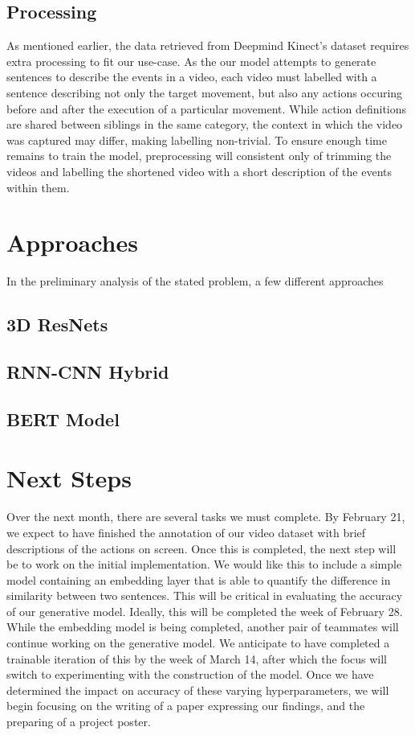 \documentclass[10pt]{article}
\begin{document}
\subsection{Processing}
As mentioned earlier, the data retrieved from Deepmind Kinect's dataset requires extra processing to fit our use-case.
As the our model attempts to generate sentences to describe
the events in a video, each video must labelled with a sentence describing not only the target movement, but also
any actions occuring before and after the execution of a particular movement. While action definitions are shared between siblings
in the same category, the context in which the video was captured may differ, making labelling non-trivial.
To ensure enough time remains to train the model, preprocessing will consistent only of 
trimming the videos and labelling the shortened video with a short description of the events within them.

\section{Approaches}

In the preliminary analysis of the stated problem, a few different approaches 

\subsection{3D ResNets}

\subsection{RNN-CNN Hybrid}

\subsection{BERT Model}


\section{Next Steps}
Over the next month, there are several tasks we must complete. By February 21, we expect to have finished the annotation of our video
dataset with brief descriptions of the actions on screen. Once this is completed, the next step will be to work on the initial implementation.
We would like this to include a simple model containing an embedding layer that is able to quantify the difference in similarity between
two sentences. This will be critical in evaluating the accuracy of our generative model. Ideally, this will be completed the week of February 28.
While the embedding model is being completed, another pair of teammates will continue working on the generative model. We anticipate to have completed
a trainable iteration of this by the week of March 14, after which the focus will switch to experimenting with the construction of the model. Once we
have determined the impact on accuracy of these varying hyperparameters, we will begin focusing on the writing of a paper expressing our findings, and the
preparing of a project poster.
\end{document}
